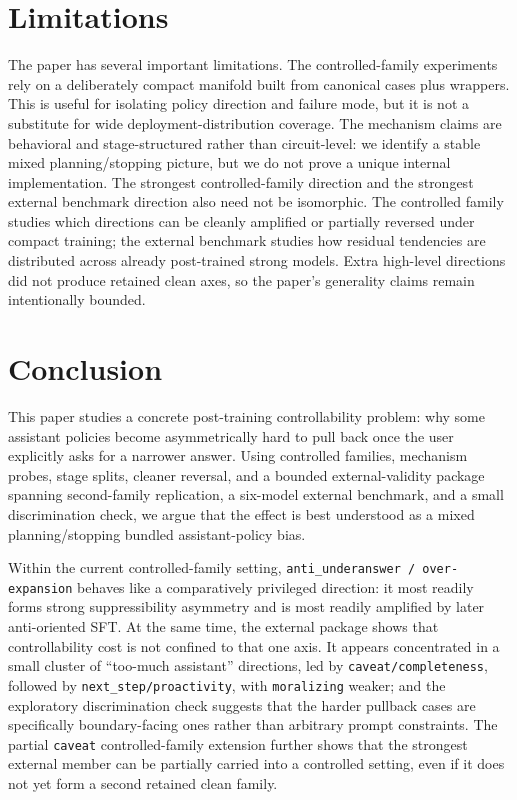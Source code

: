 \documentclass[11pt]{article}
\begin{document}
\section{Limitations}

The paper has several important limitations. The controlled-family experiments rely on a deliberately compact manifold built from canonical cases plus wrappers. This is useful for isolating policy direction and failure mode, but it is not a substitute for wide deployment-distribution coverage. The mechanism claims are behavioral and stage-structured rather than circuit-level: we identify a stable mixed planning/stopping picture, but we do not prove a unique internal implementation. The strongest controlled-family direction and the strongest external benchmark direction also need not be isomorphic. The controlled family studies which directions can be cleanly amplified or partially reversed under compact training; the external benchmark studies how residual tendencies are distributed across already post-trained strong models. Extra high-level directions did not produce retained clean axes, so the paper's generality claims remain intentionally bounded.

\section{Conclusion}

This paper studies a concrete post-training controllability problem: why some assistant policies become asymmetrically hard to pull back once the user explicitly asks for a narrower answer. Using controlled families, mechanism probes, stage splits, cleaner reversal, and a bounded external-validity package spanning second-family replication, a six-model external benchmark, and a small discrimination check, we argue that the effect is best understood as a mixed planning/stopping bundled assistant-policy bias.

Within the current controlled-family setting, \texttt{anti\_underanswer / over-expansion} behaves like a comparatively privileged direction: it most readily forms strong suppressibility asymmetry and is most readily amplified by later anti-oriented SFT. At the same time, the external package shows that controllability cost is not confined to that one axis. It appears concentrated in a small cluster of ``too-much assistant'' directions, led by \texttt{caveat/completeness}, followed by \texttt{next\_step/proactivity}, with \texttt{moralizing} weaker; and the exploratory discrimination check suggests that the harder pullback cases are specifically boundary-facing ones rather than arbitrary prompt constraints. The partial \texttt{caveat} controlled-family extension further shows that the strongest external member can be partially carried into a controlled setting, even if it does not yet form a second retained clean family.
\end{document}
